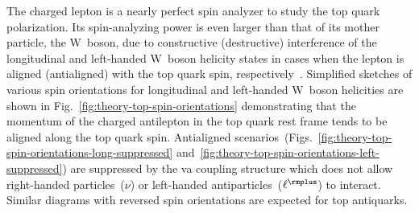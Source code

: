 The charged lepton is a nearly perfect spin analyzer to study the top quark polarization. Its spin-analyzing power is even larger than that of its mother particle, the $\mathrm{W}$~boson, due to constructive (destructive) interference of the longitudinal and left-handed $\mathrm{W}$~boson helicity states in cases when the lepton is aligned (antialigned) with the top quark spin, respectively~\cite{Bernreuther:2008ju}. Simplified sketches of various spin orientations for longitudinal and left-handed $\mathrm{W}$~boson helicities are shown in Fig.~\ref{fig:theory-top-spin-orientations} demonstrating that the momentum of the charged antilepton in the top quark rest frame tends to be aligned along the top quark spin. Antialigned scenarios~(Figs.~\ref{fig:theory-top-spin-orientations-long-suppressed} and~\ref{fig:theory-top-spin-orientations-left-suppressed}) are suppressed by the \gls{va} coupling structure which does not allow right-handed particles~($\nu$) or left-handed antiparticles~($\ell^{\rmplus}$) to interact. Similar diagrams with reversed spin orientations are expected for top antiquarks.


